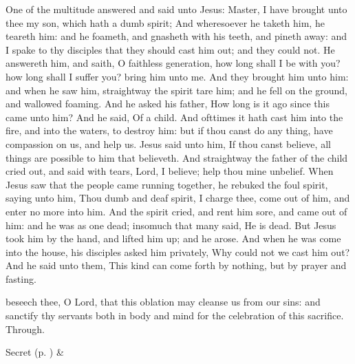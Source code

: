  One of the multitude answered and said unto Jesus: Master, I have brought unto thee my son, which hath a dumb spirit; And wheresoever he taketh him, he teareth him: and he foameth, and gnasheth with his teeth, and pineth away: and I spake to thy disciples that they should cast him out; and they could not. He answereth him, and saith, O faithless generation, how long shall I be with you? how long shall I suffer you? bring him unto me. And they brought him unto him: and when he saw him, straightway the spirit tare him; and he fell on the ground, and wallowed foaming. And he asked his father, How long is it ago since this came unto him? And he said, Of a child. And ofttimes it hath cast him into the fire, and into the waters, to destroy him: but if thou canst do any thing, have compassion on us, and help us. Jesus said unto him, If thou canst believe, all things are possible to him that believeth. And straightway the father of the child cried out, and said with tears, Lord, I believe; help thou mine unbelief. When Jesus saw that the people came running together, he rebuked the foul spirit, saying unto him, Thou dumb and deaf spirit, I charge thee, come out of him, and enter no more into him. And the spirit cried, and rent him sore, and came out of him: and he was as one dead; insomuch that many said, He is dead. But Jesus took him by the hand, and lifted him up; and he arose. And when he was come into the house, his disciples asked him privately, Why could not we cast him out? And he said unto them, This kind can come forth by nothing, but by prayer and fasting.


\vspace{-0.25\baselineskip}

\secret

\vspace{-0.1\baselineskip}

 beseech thee, O Lord, that this oblation may cleanse us from our sins: and sanctify thy servants both in body and mind for the celebration of this sacrifice. Through.
\begin{rubric}
     Secret  (p. \pageref{SPSaints}) \&  
\end{rubric}


